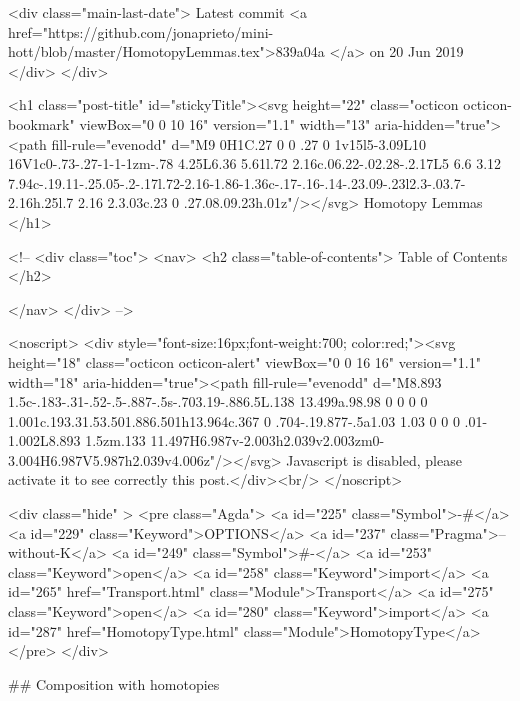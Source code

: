     <div class="main-last-date">
      Latest commit <a href="https://github.com/jonaprieto/mini-hott/blob/master/HomotopyLemmas.tex">839a04a </a> on  20 Jun 2019
    </div>
  </div>
  
  <h1 class="post-title" id="stickyTitle"><svg height="22" class="octicon octicon-bookmark" viewBox="0 0 10 16" version="1.1" width="13" aria-hidden="true"><path fill-rule="evenodd" d="M9 0H1C.27 0 0 .27 0 1v15l5-3.09L10 16V1c0-.73-.27-1-1-1zm-.78 4.25L6.36 5.61l.72 2.16c.06.22-.02.28-.2.17L5 6.6 3.12 7.94c-.19.11-.25.05-.2-.17l.72-2.16-1.86-1.36c-.17-.16-.14-.23.09-.23l2.3-.03.7-2.16h.25l.7 2.16 2.3.03c.23 0 .27.08.09.23h.01z"/></svg> Homotopy Lemmas
  </h1>

  <!-- 
  <div class="toc">
    <nav>
    <h2 class="table-of-contents"> Table of Contents </h2>
      

    </nav>
  </div>
   -->

  <noscript>
  <div style="font-size:16px;font-weight:700; color:red;"><svg height="18" class="octicon octicon-alert" viewBox="0 0 16 16" version="1.1" width="18" aria-hidden="true"><path fill-rule="evenodd" d="M8.893 1.5c-.183-.31-.52-.5-.887-.5s-.703.19-.886.5L.138 13.499a.98.98 0 0 0 0 1.001c.193.31.53.501.886.501h13.964c.367 0 .704-.19.877-.5a1.03 1.03 0 0 0 .01-1.002L8.893 1.5zm.133 11.497H6.987v-2.003h2.039v2.003zm0-3.004H6.987V5.987h2.039v4.006z"/></svg> Javascript is disabled, please activate it to see correctly this post.</div><br/>
  </noscript>

  <div class="hide" >
<pre class="Agda">
<a id="225" class="Symbol">{-#</a> <a id="229" class="Keyword">OPTIONS</a> <a id="237" class="Pragma">--without-K</a> <a id="249" class="Symbol">#-}</a>
<a id="253" class="Keyword">open</a> <a id="258" class="Keyword">import</a> <a id="265" href="Transport.html" class="Module">Transport</a>
<a id="275" class="Keyword">open</a> <a id="280" class="Keyword">import</a> <a id="287" href="HomotopyType.html" class="Module">HomotopyType</a>
</pre>
</div>

## Composition with homotopies


